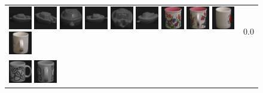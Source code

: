 \begin{figure}[tbp]
\begin{center}
\begin{tabular}{m{11cm} | m{3cm} |}
\includegraphics[width=1cm]{coil/beeld-24.eps} 
\includegraphics[width=1cm]{coil/beeld-25.eps} 
\includegraphics[width=1cm]{coil/beeld-28.eps} 
\includegraphics[width=1cm]{coil/beeld-27.eps} 
\includegraphics[width=1cm]{coil/beeld-26.eps} 
\includegraphics[width=1cm]{coil/beeld-29.eps} 
\includegraphics[width=1cm]{coil/beeld-8.eps} 
\includegraphics[width=1cm]{coil/beeld-11.eps} 
\includegraphics[width=1cm]{coil/beeld-38.eps} 
\includegraphics[width=1cm]{coil/beeld-41.eps} & {\scriptsize 0.0} \\ 
\includegraphics[width=1cm]{coil/beeld-48.eps} 
\includegraphics[width=1cm]{coil/beeld-50.eps} 

\end{tabular}
\end{center}
\end{figure}
